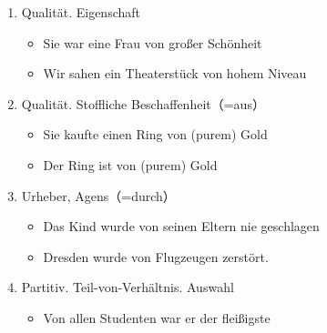 \documentclass[UTF8]{report}
\begin{document}
\begin{enumerate}
    \begin{enumerate}
        \item Qualität. Eigenschaft
        \begin{itemize}
            \item Sie war eine Frau von großer Schönheit
            \item Wir sahen ein Theaterstück von hohem Niveau
        \end{itemize}
        \item Qualität. Stoffliche Beschaffenheit（=aus）
        \begin{itemize}
            \item Sie kaufte einen Ring von (purem) Gold
            \item Der Ring ist von (purem) Gold
        \end{itemize}
        \item Urheber, Agens（=durch）
        \begin{itemize}
            \item Das Kind wurde von seinen Eltern nie geschlagen
            \item Dresden wurde von Flugzeugen zerstört.
        \end{itemize}
        \item Partitiv. Teil-von-Verhältnis. Auswahl
        \begin{itemize}
            \item Von allen Studenten war er der fleißigste
        \end{itemize}
    \end{enumerate}
\end{enumerate}
\end{document}
